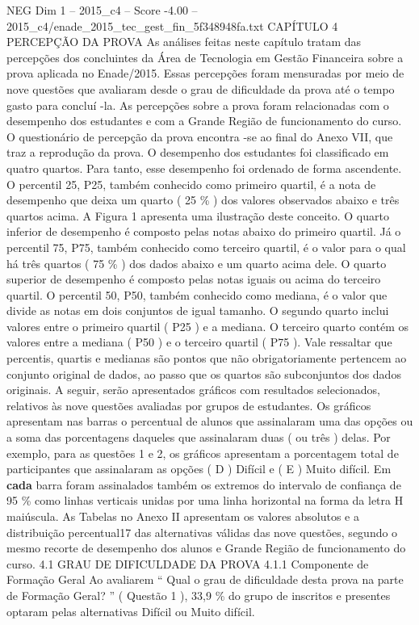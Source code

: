 \begin{textsample}{NEG Dim 1 – 2015\_c4 – Score -4.00 – 2015\_c4/enade\_2015\_tec\_gest\_fin\_5f348948fa.txt}  \label{ex:f1_neg_107}
CAPÍTULO 4 PERCEPÇÃO DA PROVA As análises feitas neste capítulo tratam das percepções dos concluintes da Área de Tecnologia em Gestão Financeira sobre a prova aplicada no Enade/2015.
Essas percepções foram mensuradas por meio de nove questões que avaliaram desde o grau de dificuldade da prova até o tempo gasto para concluí -la.
As percepções sobre a prova foram relacionadas com o desempenho dos estudantes e com a Grande Região de funcionamento do curso.
O questionário de percepção da prova encontra -se ao final do Anexo VII, que traz a reprodução da prova.
O desempenho dos estudantes foi classificado em quatro quartos.
Para tanto, esse desempenho foi ordenado de forma ascendente.
O percentil 25, P25, também conhecido como primeiro quartil, é a nota de desempenho que deixa um quarto ( 25 \% ) dos valores observados abaixo e três quartos acima.
A Figura 1 apresenta uma ilustração deste conceito.
O quarto inferior de desempenho é composto pelas notas abaixo do primeiro quartil.
Já o percentil 75, P75, também conhecido como terceiro quartil, é o valor para o qual há três quartos ( 75 \% ) dos dados abaixo e um quarto acima dele.
O quarto superior de desempenho é composto pelas notas iguais ou acima do terceiro quartil.
O percentil 50, P50, também conhecido como mediana, é o valor que divide as notas em dois conjuntos de igual tamanho.
O segundo quarto inclui valores entre o primeiro quartil ( P25 ) e a mediana.
O terceiro quarto contém os valores entre a mediana ( P50 ) e o terceiro quartil ( P75 ).
Vale ressaltar que percentis, quartis e medianas são pontos que não obrigatoriamente pertencem ao conjunto original de dados, ao passo que os quartos são subconjuntos dos dados originais.
A seguir, serão apresentados gráficos com resultados selecionados, relativos às nove questões avaliadas por grupos de estudantes.
Os gráficos apresentam nas barras o percentual de alunos que assinalaram uma das opções ou a soma das porcentagens daqueles que assinalaram duas ( ou três ) delas.
Por exemplo, para as questões 1 e 2, os gráficos apresentam a porcentagem total de participantes que assinalaram as opções ( D ) Difícil e ( E ) Muito difícil.
Em \textbf{cada} barra foram assinalados também os extremos do intervalo de confiança de 95 \% como linhas verticais unidas por uma linha horizontal na forma da letra H maiúscula.
As Tabelas no Anexo II apresentam os valores absolutos e a distribuição percentual17 das alternativas válidas das nove questões, segundo o mesmo recorte de desempenho dos alunos e Grande Região de funcionamento do curso. 4.1 GRAU DE DIFICULDADE DA PROVA 4.1.1 Componente de Formação Geral Ao avaliarem “ Qual o grau de dificuldade desta prova na parte de Formação Geral? ” ( Questão 1 ), 33,9 \% do grupo de inscritos e presentes optaram pelas alternativas Difícil ou Muito difícil.

\end{textsample}
